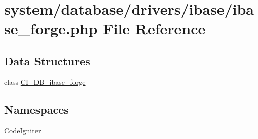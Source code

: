 \hypertarget{ibase__forge_8php}{}\section{system/database/drivers/ibase/ibase\+\_\+forge.php File Reference}
\label{ibase__forge_8php}
\subsection*{Data Structures}
\begin{DoxyCompactItemize}
\item 
class \mbox{\hyperlink{class_c_i___d_b__ibase__forge}{C\+I\+\_\+\+D\+B\+\_\+ibase\+\_\+forge}}
\end{DoxyCompactItemize}
\subsection*{Namespaces}
\begin{DoxyCompactItemize}
\item 
 \mbox{\hyperlink{namespace_code_igniter}{Code\+Igniter}}
\end{DoxyCompactItemize}
